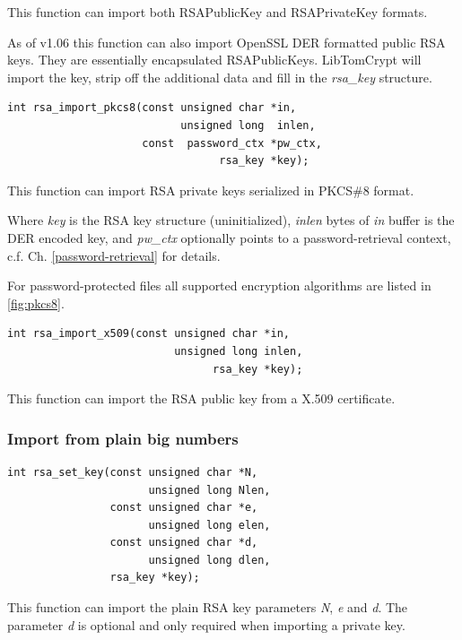 \documentclass[synpaper]{book}
\begin{document}
This function can import both RSAPublicKey and RSAPrivateKey formats.

As of v1.06 this function can also import OpenSSL DER formatted public RSA keys.  They are essentially encapsulated RSAPublicKeys.  LibTomCrypt will
import the key, strip off the additional data and fill in the \textit{rsa\_key} structure.

\begin{verbatim}
int rsa_import_pkcs8(const unsigned char *in,
                           unsigned long  inlen,
                     const  password_ctx *pw_ctx,
                                 rsa_key *key);
\end{verbatim}

This function can import RSA private keys serialized in PKCS\#8 format.

Where \textit{key} is the RSA key structure (uninitialized), \textit{inlen} bytes of \textit{in} buffer is the DER encoded key,
and \textit{pw\_ctx} optionally points to a password-retrieval context, c.f. Ch. \ref{password-retrieval} for details.

For password-protected files all supported encryption algorithms are listed in \ref{fig:pkcs8}.

\begin{verbatim}
int rsa_import_x509(const unsigned char *in,
                          unsigned long inlen,
                                rsa_key *key);
\end{verbatim}

This function can import the RSA public key from a X.509 certificate.

\subsubsection{Import from plain big numbers}

\begin{verbatim}
int rsa_set_key(const unsigned char *N,
                      unsigned long Nlen,
                const unsigned char *e,
                      unsigned long elen,
                const unsigned char *d,
                      unsigned long dlen,
                rsa_key *key);
\end{verbatim}

This function can import the plain RSA key parameters \textit{N}, \textit{e} and \textit{d}.
The parameter \textit{d} is optional and only required when importing a private key.
\end{document}

